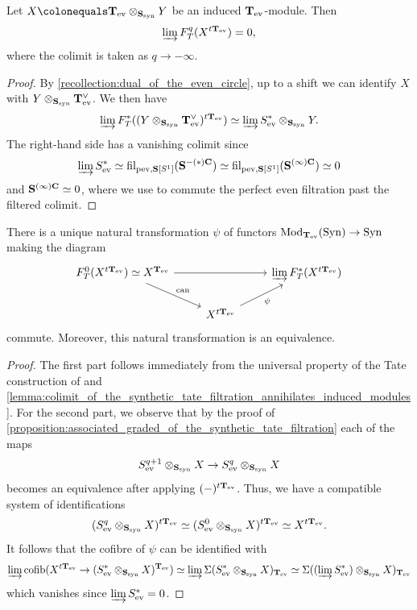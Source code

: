 \documentclass[oneside,a4paper]{amsart}
\begin{document}
\begin{lemma}
\label{lemma:colimit_of_the_synthetic_tate_filtration_annihilates_induced_modules}
Let $X \colonequals \evencircle \otimes_{\synsphere} Y$ be an induced $\mathbf{T}_{\mathrm{ev}}$-module. Then 
\[
\varinjlim F^{q}_{T}(X^{t \mathbf{T}_{\mathrm{ev}}}) = 0, 
\]
where the colimit is taken as $q \to -\infty$. 
\end{lemma}

\begin{proof}
By \cref{recollection:dual_of_the_even_circle}, up to a shift we can identify $X$ with $Y \otimes_{\mathbf{S}_{\mathrm{syn}}} \mathbf{T}_{\mathrm{ev}}^{\vee}$. We then have 
\[
\varinjlim F^{\ast}_{T}((Y \otimes_{\mathbf{S}_{\mathrm{syn}}} \mathbf{T}_{\mathrm{ev}}^{\vee})^{t \mathbf{T}_{\mathrm{ev}}}) \simeq \varinjlim S^{\ast}_{\mathrm{ev}} \otimes_{\mathbf{S}_{\mathrm{syn}}} Y.
\]
The right-hand side has a vanishing colimit since
\[
\varinjlim S^{\ast}_{\mathrm{ev}} \simeq \operatorname{fil}_{\mathrm{pev}, \mathbf{S}[S^{1}]}(\mathbf{S}^{-(\ast)\mathbf{C}}) \simeq \operatorname{fil}_{\mathrm{pev}, \mathbf{S}[S^{1}]}(\mathbf{S}^{(\infty)\mathbf{C}}) \simeq 0 
\]
and $\mathbf{S}^{(\infty)\mathbf{C}} \simeq 0$, where we use \cite[{Lemma 2.24}]{pstrkagowski2025perfect} to commute the perfect even filtration past the filtered colimit. 
\end{proof}

\begin{proposition}
\label{proposition:colimit_of_the_synthetic_tate_filtration}
There is a unique natural transformation $\psi$ of functors $\mathrm{Mod}_{\mathbf{T}_{\mathrm{ev}}}(\mathrm{Syn}) \rightarrow \mathrm{Syn}$ making the diagram 
\[\begin{tikzcd}
	{F^{0}_{T}(X^{t \evencircle}) \simeq X^{\evencircle}} && {\varinjlim F^{\ast}_{T}(X^{t \evencircle})} \\
	& {X^{t \evencircle}} & %
	\arrow[from=1-1, to=1-3]
	\arrow["{\mathrm{can}}", from=1-1, to=2-2]
	\arrow["\psi"', from=2-2, to=1-3]
\end{tikzcd}
\]
commute. Moreover, this natural transformation is an equivalence. 
\end{proposition}

\begin{proof}
The first part follows immediately from the universal property of the Tate construction of \cite[{Proposition 2.4.10}]{raksit:2020} and \cref{lemma:colimit_of_the_synthetic_tate_filtration_annihilates_induced_modules}. For the second part, we observe that by the proof of \cref{proposition:associated_graded_of_the_synthetic_tate_filtration} each of the maps 
\[
S^{q+1}_{\mathrm{ev}} \otimes_{\mathbf{S}_{\mathrm{syn}}} X \rightarrow S^{q}_{\mathrm{ev}} \otimes_{\mathbf{S}_{\mathrm{syn}}} X 
\]
becomes an equivalence after applying $(-)^{t \mathbf{T}_{\mathrm{ev}}}$. Thus, we have a compatible system of identifications
\[
(S^{q}_{\mathrm{ev}} \otimes_{\mathbf{S}_{\mathrm{syn}}} X)^{t \mathbf{T}_{\mathrm{ev}}} \simeq (S^{0}_{\mathrm{ev}} \otimes_{\mathbf{S}_{\mathrm{syn}}} X)^{t \mathbf{T}_{\mathrm{ev}}} \simeq X^{t \mathbf{T}_{\mathrm{ev}}}.
\]
It follows that the cofibre of $\psi$ can be identified with 
\[
\varinjlim \mathrm{cofib}(X^{t \mathbf{T}_{\mathrm{ev}}} \rightarrow (S^{\ast}_{\mathrm{ev}} \otimes_{\mathbf{S}_{\mathrm{syn}}} X)^{\mathbf{T}_{\mathrm{ev}}}) \simeq \varinjlim \Sigma (S^{\ast}_{\mathrm{ev}} \otimes_{\mathbf{S}_{\mathrm{syn}}} X)_{\mathbf{T}_{\mathrm{ev}}} \simeq \Sigma((\varinjlim S^{\ast}_{\mathrm{ev}}) \otimes_{\mathbf{S}_{\mathrm{syn}}} X)_{\mathbf{T}_{\mathrm{ev}}}
\] 
which vanishes since $\varinjlim S^{\ast}_{\mathrm{ev}} = 0$. 
\end{proof}
\end{document}
